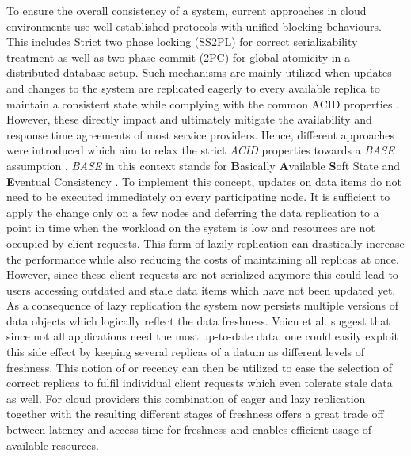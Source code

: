 To ensure the overall consistency of a system, current approaches in cloud environments use well-established protocols with unified blocking behaviours. 
This includes Strict two phase locking (SS2PL) for correct serializability treatment as well as two-phase commit (2PC) for global atomicity in a distributed database 
setup. Such mechanisms are mainly utilized when updates and changes to the system are replicated eagerly to every available replica to maintain a consistent state
while complying with the common ACID properties \cite{tamer:2005}.
However, these  directly impact and ultimately mitigate the availability and response time 
agreements of most service providers.
Hence, different approaches were introduced which aim to relax the strict \textit{ACID} properties towards 
a \textit{BASE} assumption \cite{base2008}.
\textit{BASE} in this context stands for \textbf{B}asically \textbf{A}vailable \textbf{S}oft 
State and \textbf{E}ventual Consistency \cite{shapiro:2011}.
To implement this concept, updates on data items do not need to be executed immediately on every participating node.
It is sufficient to apply the change only on a few nodes and deferring the data replication to a point in time when the workload on the system is low and 
resources are not occupied by client requests. This form of lazily replication can drastically increase the performance while also reducing the costs of maintaining
all replicas at once. However, since these client requests are not serialized anymore this could lead to users accessing outdated and stale data items
which have not been updated yet.
As a consequence of lazy replication the system now persists multiple versions of data objects which logically reflect the data freshness.
Voicu et al. \cite{voicu:2010} suggest that since not all applications need the most up-to-date data, one could easily exploit 
this side effect by keeping several replicas of a datum as different levels of freshness.
This notion of or recency can then be utilized to ease the selection of correct replicas to fulfil individual client requests which even tolerate stale data as well.
For cloud providers this combination of eager and lazy replication together with the resulting different stages of freshness 
offers a great trade off between latency and access time for freshness and enables efficient usage of available resources.



